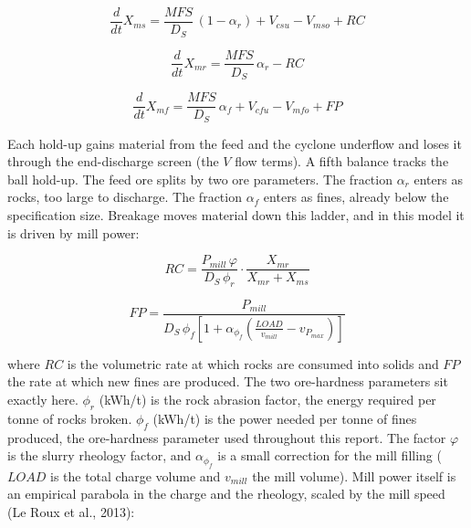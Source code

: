 \documentclass[
  14pt,
]{extarticle}
\begin{document}
\begin{equation}\frac{d}{dt}X_{ms}=\frac{MFS}{D_S}\,(1-\alpha_r)+V_{csu}-V_{mso}+RC\tag{1b}\end{equation}

\begin{equation}\frac{d}{dt}X_{mr}=\frac{MFS}{D_S}\,\alpha_r-RC\tag{1c}\end{equation}

\begin{equation}\frac{d}{dt}X_{mf}=\frac{MFS}{D_S}\,\alpha_f+V_{cfu}-V_{mfo}+FP\tag{1d}\end{equation}

\endgroup

Each hold-up gains material from the feed and the cyclone underflow and
loses it through the end-discharge screen (the \(V\) flow terms). A
fifth balance tracks the ball hold-up. The feed ore splits by two ore
parameters. The fraction \(\alpha_r\) enters as rocks, too large to
discharge. The fraction \(\alpha_f\) enters as fines, already below the
specification size. Breakage moves material down this ladder, and in
this model it is driven by mill power:

\begingroup\small

\begin{equation}RC=\frac{P_{mill}\,\varphi}{D_S\,\phi_r}\cdot\frac{X_{mr}}{X_{mr}+X_{ms}}\tag{2a}\end{equation}

\begin{equation}FP=\frac{P_{mill}}{D_S\,\phi_f\left[1+\alpha_{\phi_f}\left(\frac{LOAD}{v_{mill}}-v_{P_{max}}\right)\right]}\tag{2b}\end{equation}

\endgroup

where \(RC\) is the volumetric rate at which rocks are consumed into
solids and \(FP\) the rate at which new fines are produced. The two
ore-hardness parameters sit exactly here. \(\phi_r\) (kWh/t) is the rock
abrasion factor, the energy required per tonne of rocks broken.
\(\phi_f\) (kWh/t) is the power needed per tonne of fines produced, the
ore-hardness parameter used throughout this report. The factor
\(\varphi\) is the slurry rheology factor, and \(\alpha_{\phi_f}\) is a
small correction for the mill filling (\(LOAD\) is the total charge
volume and \(v_{mill}\) the mill volume). Mill power itself is an
empirical parabola in the charge and the rheology, scaled by the mill
speed (Le Roux et al., 2013):

\begingroup\small
\end{document}
